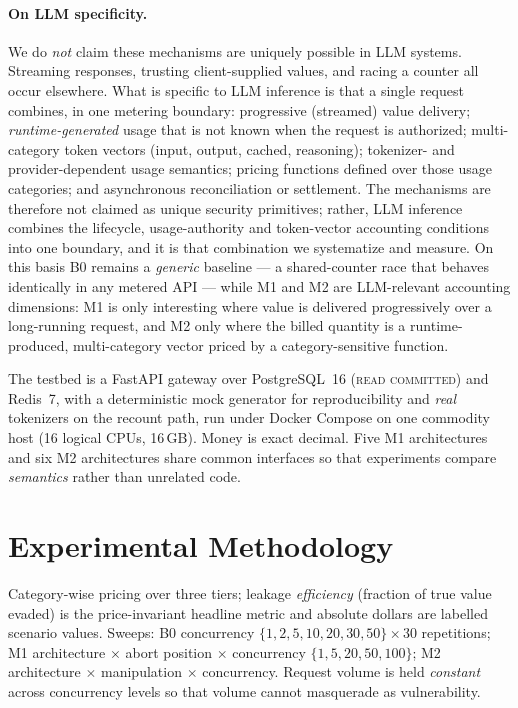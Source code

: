 \documentclass[11pt]{article}
\begin{document}
\paragraph{On LLM specificity.} We do \emph{not} claim these mechanisms are uniquely
possible in LLM systems. Streaming responses, trusting client-supplied values, and racing
a counter all occur elsewhere. What is specific to LLM inference is that a single request
combines, in one metering boundary: progressive (streamed) value delivery;
\emph{runtime-generated} usage that is not known when the request is authorized;
multi-category token vectors (input, output, cached, reasoning); tokenizer- and
provider-dependent usage semantics; pricing functions defined over those usage
categories; and asynchronous reconciliation or settlement. The mechanisms are therefore
not claimed as unique security primitives; rather, LLM inference combines the lifecycle,
usage-authority and token-vector accounting conditions into one boundary, and it is that
combination we systematize and measure. On this basis B0 remains a \emph{generic}
baseline --- a shared-counter race that behaves identically in any metered API --- while
M1 and M2 are LLM-relevant accounting dimensions: M1 is only interesting where value is
delivered progressively over a long-running request, and M2 only where the billed
quantity is a runtime-produced, multi-category vector priced by a category-sensitive
function.

The testbed is a FastAPI gateway over PostgreSQL~16 (\textsc{read committed}) and
Redis~7, with a deterministic mock generator for reproducibility and \emph{real}
tokenizers on the recount path, run under Docker Compose on one commodity host (16
logical CPUs, 16\,GB). Money is exact decimal. Five M1 architectures and six M2
architectures share common interfaces so that experiments compare \emph{semantics}
rather than unrelated code.

\section{Experimental Methodology}
Category-wise pricing over three tiers; leakage \emph{efficiency} (fraction of true value
evaded) is the price-invariant headline metric and absolute dollars are labelled scenario
values. Sweeps: B0 concurrency $\{1,2,5,10,20,30,50\}\times30$ repetitions; M1
architecture $\times$ abort position $\times$ concurrency $\{1,5,20,50,100\}$; M2
architecture $\times$ manipulation $\times$ concurrency. Request volume is held
\emph{constant} across concurrency levels so that volume cannot masquerade as
vulnerability.
\end{document}
